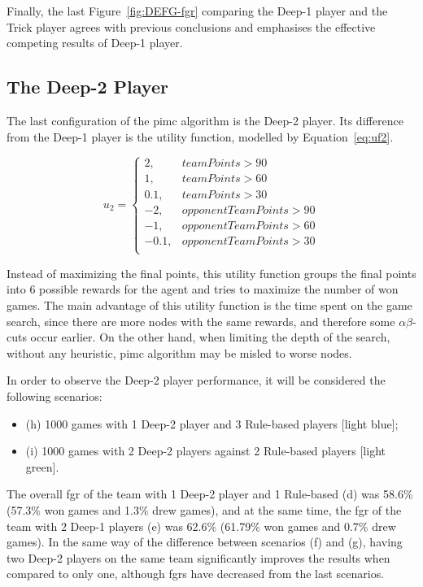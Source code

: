 Finally, the last Figure~\ref{fig:DEFG-fgr} comparing the Deep-1 player and the Trick player agrees with previous conclusions and emphasises the effective competing results of Deep-1 player.


\subsection{The Deep-2 Player}

The last configuration of the \ac{pimc} algorithm is the Deep-2 player.
Its difference from the Deep-1 player is the utility function, modelled by Equation~\ref{eq:uf2}.

\begin{equation} \label{eq:uf2}
u_2 = \left\{
                \begin{array}{ll}
                  2, & teamPoints > 90\\
                  1, & teamPoints > 60\\
                  0.1, & teamPoints > 30\\
                  -2, & opponentTeamPoints >90\\
                  -1, & opponentTeamPoints > 60\\
                  -0.1, & opponentTeamPoints > 30\\
                \end{array}
              \right.
\end{equation}

Instead of maximizing the final points, this utility function groups the final points into 6 possible rewards for the agent and tries to maximize the number of won games.
The main advantage of this utility function is the time spent on the game search, since there are more nodes with the same rewards, and therefore some $\alpha\beta$-cuts occur earlier.
On the other hand, when limiting the depth of the search, without any heuristic, \ac{pimc} algorithm may be misled to worse nodes.

In order to observe the Deep-2 player performance, it will be considered the following scenarios:
\begin{itemize}
\item (h) 1000 games with 1 Deep-2 player and 3 Rule-based players [light blue];
\item (i) 1000 games with 2 Deep-2 players against 2 Rule-based players [light green].
\end{itemize}

The overall \ac{fgr} of the team with 1 Deep-2 player and 1 Rule-based (d) was 58.6\% (57.3\% won games and 1.3\% drew games), and at the same time, the \ac{fgr} of the team with 2 Deep-1 players (e) was 62.6\% (61.79\% won games and 0.7\% drew games).
In the same way of the difference between scenarios (f) and (g), having two Deep-2 players on the same team significantly improves the results when compared to only one, although \acp{fgr} have decreased from the last scenarios.

